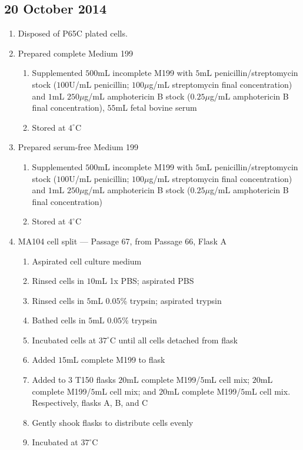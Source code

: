 
\subsection*{20 October 2014}

\begin{enumerate}
	\item Disposed of P65C plated cells.
	
	\item Prepared complete Medium 199
		\begin{enumerate}
				\item Supplemented $500$mL incomplete M199 with $5$mL penicillin/streptomycin stock ($100$U/mL penicillin; $100\mu$g/mL streptomycin final concentration) and $1$mL $250\mu$g/mL amphotericin B stock ($0.25\mu$g/mL amphotericin B final concentration), $55$mL fetal bovine serum
				\item Stored at $4^{\circ}$C
		\end{enumerate}
	\item Prepared serum-free Medium 199
		\begin{enumerate}
			\item Supplemented $500$mL incomplete M199 with $5$mL penicillin/streptomycin stock ($100$U/mL penicillin; $100\mu$g/mL streptomycin final concentration) and $1$mL $250\mu$g/mL amphotericin B stock ($0.25\mu$g/mL amphotericin B final concentration)
			\item Stored at $4^{\circ}$C
		\end{enumerate}

	\item MA104 cell split --- Passage 67, from Passage 66, Flask A
		\begin{enumerate}
			\item Aspirated cell culture medium
			\item Rinsed cells in $10$mL 1x PBS; aspirated PBS
			\item Rinsed cells in $5$mL $0.05$\% trypsin; aspirated trypsin
			\item Bathed cells in $5$mL $0.05$\% trypsin
			\item Incubated cells at $37^{\circ}$C until all cells detached from flask
			\item Added $15$mL complete M199 to flask
			\item Added to $3$ T150 flasks $20$mL complete M199/$5$mL cell mix; $20$mL complete M199/$5$mL cell mix; and $20$mL complete M199/$5$mL cell mix. Respectively, flasks A, B, and C
			\item Gently shook flasks to distribute cells evenly
			\item Incubated at $37^{\circ}$C
		\end{enumerate}
	

\end{enumerate}
